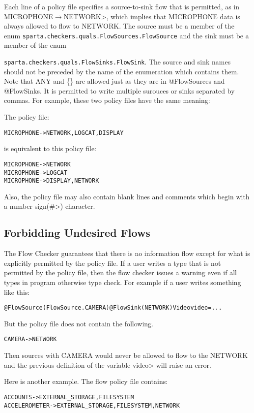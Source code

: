 Each line of a policy file specifies a source-to-sink flow that is permitted, as in
\<MICROPHONE$\rightarrow$NETWORK>, which implies that
MICROPHONE data is always allowed to flow to NETWORK.  
The source must be a member of the enum
\verb+sparta.checkers.quals.FlowSources.FlowSource+ and the sink must be a
member of the enum 

\noindent\verb+sparta.checkers.quals.FlowSinks.FlowSink+.  The source 
and sink names should not be preceded by the name of the enumeration which contains them.
Note that ANY and \{\} are allowed just as they are in @FlowSources and @FlowSinks.
It is permitted to write multiple surouces or sinks separated by commas. For example,
these two policy files have the same meaning:


 The policy file:
\begin{alltt}
   MICROPHONE -> NETWORK, LOGCAT, DISPLAY
\end{alltt}
is equivalent to this policy file:
\begin{alltt}
   MICROPHONE -> NETWORK
   MICROPHONE -> LOGCAT
   MICROPHONE -> DISPLAY, NETWORK
\end{alltt}

Also, the policy file may also contain blank lines and comments which begin with 
a number sign(\<\#>) character.


\subsection{Forbidding Undesired Flows}
\label{sec:undsiredflows}
The Flow Checker guarantees that there is no information
flow except for what is explicitly permitted by the policy file. If a user writes a type that is
not permitted by the policy file, then the flow checker issues a warning  even if all types in program otherwise type check. For example if a user writes something like this:
\begin{alltt}
@FlowSource(FlowSource.CAMERA) @FlowSink(NETWORK) Video video = ...
\end{alltt}

But the policy file does not contain the following.

\begin{alltt}
CAMERA -> NETWORK
\end{alltt}

Then sources with CAMERA would never be allowed to flow to the 
NETWORK and the previous definition of the variable \<video> will raise an error.

Here is another example.
The  flow policy file contains:
\begin{alltt}
  ACCOUNTS      -> EXTERNAL_STORAGE, FILESYSTEM
  ACCELEROMETER -> EXTERNAL_STORAGE, FILESYSTEM, NETWORK
\end{alltt}

